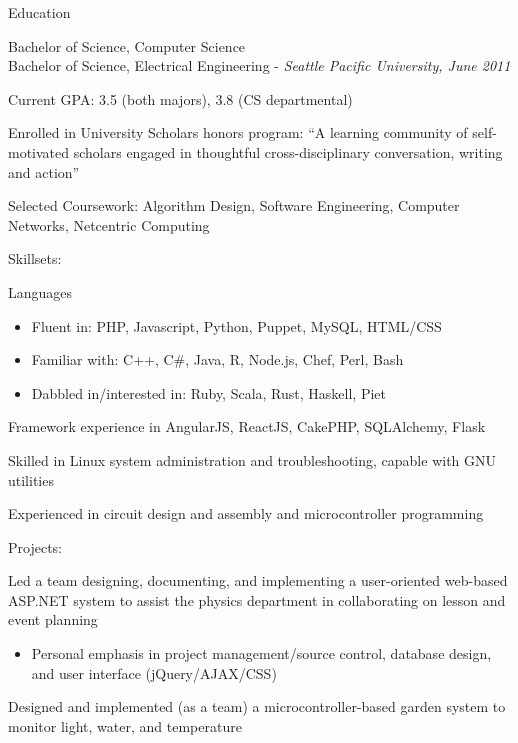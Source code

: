 \documentclass[letterpaper,10pt]{article}
\newenvironment{res_section}[1]{%
  \vskip 6pt
  \noindent
  {\Large \textbf{#1}}\\
  \rule[8pt]{\textwidth}{0.5pt}
  \vskip -8pt
}{
}
\newenvironment{res_subsection}[1]{%
  \vskip 4pt
  \noindent
  \textbf{\large{#1}}
  \begin{itemize}
}{
  \end{itemize}
}
\begin{document}
\begin{res_section}{Education}
\begin{res_subsection}{Bachelor of Science, Computer Science\\
Bachelor of Science, Electrical Engineering - \em{Seattle Pacific University, June 2011}
}
  \item Current GPA: 3.5 (both majors), 3.8 (CS departmental)
  \item Enrolled in University Scholars honors program: ``A learning community of self-motivated scholars engaged in thoughtful cross-disciplinary conversation, writing and action''
  \item Selected Coursework: Algorithm Design, Software Engineering, Computer Networks, Netcentric Computing
\end{res_subsection}
\begin{res_subsection}{Skillsets:}
  \item Languages
  \begin{itemize}
    \item Fluent in: PHP, Javascript, Python, Puppet, MySQL, HTML/CSS
    \item Familiar with: C++, C#, Java, R, Node.js, Chef, Perl, Bash
    \item Dabbled in/interested in: Ruby, Scala, Rust, Haskell, Piet
  \end{itemize}
  \item Framework experience in AngularJS, ReactJS, CakePHP, SQLAlchemy, Flask
  \item Skilled in Linux system administration and troubleshooting, capable with GNU utilities
  \item Experienced in circuit design and assembly and microcontroller programming
\end{res_subsection}
\begin{res_subsection}{Projects:}
  \item Led a team designing, documenting, and implementing a user-oriented web-based ASP.NET system  to assist the physics department in collaborating on lesson and event planning
  \begin{itemize}
    \item Personal emphasis in project management/source control, database design, and user interface (jQuery/AJAX/CSS)
  \end{itemize}
  \item Designed and implemented (as a team) a microcontroller-based garden system to monitor light, water, and temperature
  \begin{itemize}

\end{itemize}
\end{res_subsection}
\end{res_section}
\end{document}
